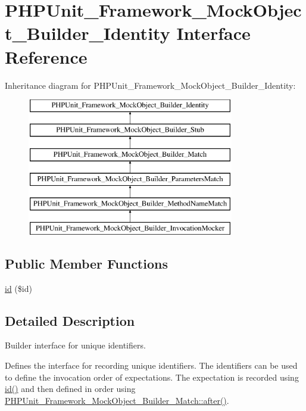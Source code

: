 \hypertarget{interface_p_h_p_unit___framework___mock_object___builder___identity}{}\section{P\+H\+P\+Unit\+\_\+\+Framework\+\_\+\+Mock\+Object\+\_\+\+Builder\+\_\+\+Identity Interface Reference}
\label{interface_p_h_p_unit___framework___mock_object___builder___identity}
Inheritance diagram for P\+H\+P\+Unit\+\_\+\+Framework\+\_\+\+Mock\+Object\+\_\+\+Builder\+\_\+\+Identity\+:\begin{figure}[H]
\begin{center}
\leavevmode
\includegraphics[height=6.000000cm]{interface_p_h_p_unit___framework___mock_object___builder___identity}
\end{center}
\end{figure}
\subsection*{Public Member Functions}
\begin{DoxyCompactItemize}
\item 
\mbox{\hyperlink{interface_p_h_p_unit___framework___mock_object___builder___identity_a6ff64f57bb98d1f8903290a95f22dc43}{id}} (\$id)
\end{DoxyCompactItemize}


\subsection{Detailed Description}
Builder interface for unique identifiers.

Defines the interface for recording unique identifiers. The identifiers can be used to define the invocation order of expectations. The expectation is recorded using \mbox{\hyperlink{interface_p_h_p_unit___framework___mock_object___builder___identity_a6ff64f57bb98d1f8903290a95f22dc43}{id()}} and then defined in order using \mbox{\hyperlink{interface_p_h_p_unit___framework___mock_object___builder___match_a02176c9b6e2cdc241de069df4423a683}{P\+H\+P\+Unit\+\_\+\+Framework\+\_\+\+Mock\+Object\+\_\+\+Builder\+\_\+\+Match\+::after()}}.

